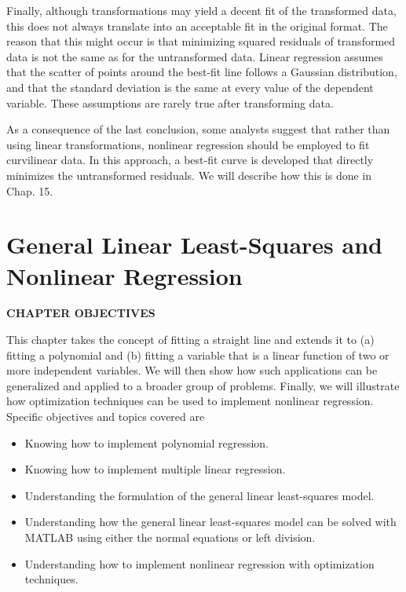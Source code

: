 \documentclass[../main.tex]{subfiles}
\begin{document}
Finally, although transformations may yield a decent fit of the transformed data, this does not always translate into an acceptable fit in the original format. The reason that this might occur is that minimizing squared residuals of transformed data is not the same as for the untransformed data. Linear regression assumes that the scatter of points around the best-fit line follows a Gaussian distribution,  and that the standard deviation is the same at every value of the dependent variable. These assumptions are rarely true after transforming data. 

As a consequence of the last conclusion, some analysts suggest that rather than using linear transformations, nonlinear regression should be employed to fit curvilinear data. In this approach, a best-fit curve is developed that directly minimizes the untransformed residuals. We will describe how this is done in Chap. 15. %


\label{cha:cha_P_15} %
\chapter{General Linear Least-Squares and Nonlinear Regression}
\textbf{CHAPTER OBJECTIVES}

\noindent This chapter takes the concept of fitting a straight line and extends it to (a) fitting a polynomial and (b) fitting a variable that is a linear function of two or more independent variables. We will then show how such applications can be generalized and applied to a broader group of problems. Finally, we will illustrate how optimization techniques can be used to implement nonlinear regression. Specific objectives and topics covered are

\begin{itemize}
	\item Knowing how to implement polynomial regression.
	\item Knowing how to implement multiple linear regression. %
	\item Understanding the formulation of the general linear least-squares model.
	\item Understanding how the general linear least-squares model can be solved with MATLAB using either the normal equations or left division.
	\item Understanding how to implement nonlinear regression with optimization techniques.
\end{itemize}
\end{document}
